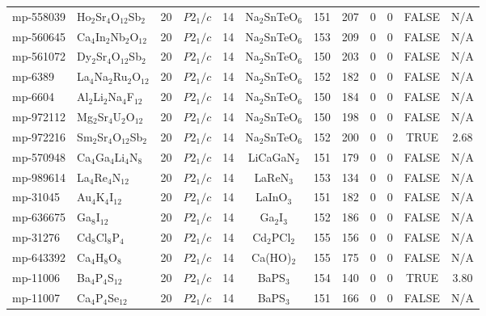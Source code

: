 {\begin{longtable}{llcccccccccc}
    mp-558039 & Ho$_{2}$Sr$_{4}$O$_{12}$Sb$_{2}$ & 20    & $P2_1/c$ & 14    & Na$_{2}$SnTeO$_{6}$ & 151   & 207   & 0     & 0     & FALSE & N/A \\
    mp-560645 & Ca$_{4}$In$_{2}$Nb$_{2}$O$_{12}$ & 20    & $P2_1/c$ & 14    & Na$_{2}$SnTeO$_{6}$ & 153   & 209   & 0     & 0     & FALSE & N/A \\
    mp-561072 & Dy$_{2}$Sr$_{4}$O$_{12}$Sb$_{2}$ & 20    & $P2_1/c$ & 14    & Na$_{2}$SnTeO$_{6}$ & 150   & 203   & 0     & 0     & FALSE & N/A \\
    mp-6389 & La$_{4}$Na$_{2}$Ru$_{2}$O$_{12}$ & 20    & $P2_1/c$ & 14    & Na$_{2}$SnTeO$_{6}$ & 152   & 182   & 0     & 0     & FALSE & N/A \\
    mp-6604 & Al$_{2}$Li$_{2}$Na$_{4}$F$_{12}$ & 20    & $P2_1/c$ & 14    & Na$_{2}$SnTeO$_{6}$ & 150   & 184   & 0     & 0     & FALSE & N/A \\
    mp-972112 & Mg$_{2}$Sr$_{4}$U$_{2}$O$_{12}$ & 20    & $P2_1/c$ & 14    & Na$_{2}$SnTeO$_{6}$ & 150   & 198   & 0     & 0     & FALSE & N/A \\
    mp-972216 & Sm$_{2}$Sr$_{4}$O$_{12}$Sb$_{2}$ & 20    & $P2_1/c$ & 14    & Na$_{2}$SnTeO$_{6}$ & 152   & 200   & 0     & 0     & TRUE  & 2.68  \\
    mp-570948 & Ca$_{4}$Ga$_{4}$Li$_{4}$N$_{8}$ & 20    & $P2_1/c$ & 14    & LiCaGaN$_{2}$ & 151   & 179   & 0     & 0     & FALSE & N/A \\
    mp-989614 & La$_{4}$Re$_{4}$N$_{12}$ & 20    & $P2_1/c$ & 14    & LaReN$_{3}$ & 153   & 134   & 0     & 0     & FALSE & N/A \\
    mp-31045 & Au$_{4}$K$_{4}$I$_{12}$ & 20    & $P2_1/c$ & 14    & LaInO$_{3}$ & 151   & 182   & 0     & 0     & FALSE & N/A \\
    mp-636675 & Ga$_{8}$I$_{12}$ & 20    & $P2_1/c$ & 14    & Ga$_{2}$I$_{3}$ & 152   & 186   & 0     & 0     & FALSE & N/A \\
    mp-31276 & Cd$_{8}$Cl$_{8}$P$_{4}$ & 20    & $P2_1/c$ & 14    & Cd$_{2}$PCl$_{2}$ & 155   & 156   & 0     & 0     & FALSE & N/A \\
    mp-643392 & Ca$_{4}$H$_{8}$O$_{8}$ & 20    & $P2_1/c$ & 14    & Ca(HO)$_{2}$ & 155   & 175   & 0     & 0     & FALSE & N/A \\
    mp-11006 & Ba$_{4}$P$_{4}$S$_{12}$ & 20    & $P2_1/c$ & 14    & BaPS$_{3}$ & 154   & 140   & 0     & 0     & TRUE  & 3.80  \\
    mp-11007 & Ca$_{4}$P$_{4}$Se$_{12}$ & 20    & $P2_1/c$ & 14    & BaPS$_{3}$ & 151   & 166   & 0     & 0     & FALSE & N/A \\

\end{longtable}}
